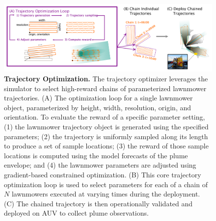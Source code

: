 \begin{figure}[h!]
    \centering
    \includegraphics[width=1\columnwidth]{figures/trajectory_optimization.pdf}
    \caption{\textbf{Trajectory Optimization.} The trajectory optimizer leverages the \PHUMES simulator to select high-reward chains of parameterized lawnmower trajectories. (A) The optimization loop for a single lawnmower object, parameterized by height, width, resolution, origin, and orientation. To evaluate the reward of a specific parameter setting, (1) the lawnmower trajectory object is generated using the specified parameters; (2) the trajectory is uniformly sampled along its length to produce a set of sample locations; (3) the reward of those sample locations is computed using the \PHUMES model forecasts of the plume envelope; and (4) the lawnmower parameters are adjusted using gradient-based constrained optimization. (B) This core trajectory optimization loop is used to select parameters for each of a chain of $N$ lawnmowers executed at varying times during the deployment. (C) The chained trajectory is then operationally validated and deployed on AUV \Sentry to collect plume observations.}
    \label{fig:traj_opt}
\end{figure}

